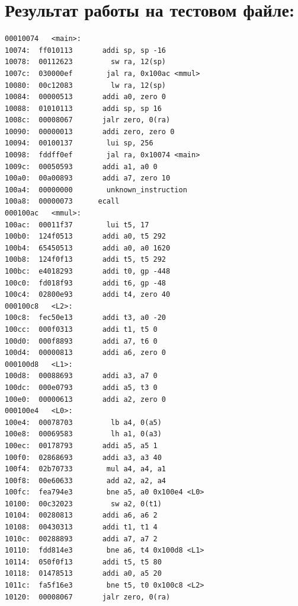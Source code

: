 \documentclass{article}
\begin{document}
\section*{Результат работы на тестовом файле:}
\begin{lstlisting}
00010074   <main>:
10074:	ff010113	   addi	sp, sp -16
10078:	00112623	     sw	ra, 12(sp)
1007c:	030000ef	    jal	ra, 0x100ac <mmul>
10080:	00c12083	     lw	ra, 12(sp)
10084:	00000513	   addi	a0, zero 0
10088:	01010113	   addi	sp, sp 16
1008c:	00008067	   jalr	zero, 0(ra)
10090:	00000013	   addi	zero, zero 0
10094:	00100137	    lui	sp, 256
10098:	fddff0ef	    jal	ra, 0x10074 <main>
1009c:	00050593	   addi	a1, a0 0
100a0:	00a00893	   addi	a7, zero 10
100a4:	00000000		unknown_instruction
100a8:	00000073	  ecall
000100ac   <mmul>:
100ac:	00011f37	    lui	t5, 17
100b0:	124f0513	   addi	a0, t5 292
100b4:	65450513	   addi	a0, a0 1620
100b8:	124f0f13	   addi	t5, t5 292
100bc:	e4018293	   addi	t0, gp -448
100c0:	fd018f93	   addi	t6, gp -48
100c4:	02800e93	   addi	t4, zero 40
000100c8   <L2>:
100c8:	fec50e13	   addi	t3, a0 -20
100cc:	000f0313	   addi	t1, t5 0
100d0:	000f8893	   addi	a7, t6 0
100d4:	00000813	   addi	a6, zero 0
000100d8   <L1>:
100d8:	00088693	   addi	a3, a7 0
100dc:	000e0793	   addi	a5, t3 0
100e0:	00000613	   addi	a2, zero 0
000100e4   <L0>:
100e4:	00078703	     lb	a4, 0(a5)
100e8:	00069583	     lh	a1, 0(a3)
100ec:	00178793	   addi	a5, a5 1
100f0:	02868693	   addi	a3, a3 40
100f4:	02b70733	    mul	a4, a4, a1
100f8:	00e60633	    add	a2, a2, a4
100fc:	fea794e3	    bne	a5, a0 0x100e4 <L0>
10100:	00c32023	     sw	a2, 0(t1)
10104:	00280813	   addi	a6, a6 2
10108:	00430313	   addi	t1, t1 4
1010c:	00288893	   addi	a7, a7 2
10110:	fdd814e3	    bne	a6, t4 0x100d8 <L1>
10114:	050f0f13	   addi	t5, t5 80
10118:	01478513	   addi	a0, a5 20
1011c:	fa5f16e3	    bne	t5, t0 0x100c8 <L2>
10120:	00008067	   jalr	zero, 0(ra)


\end{lstlisting}
\end{document}
